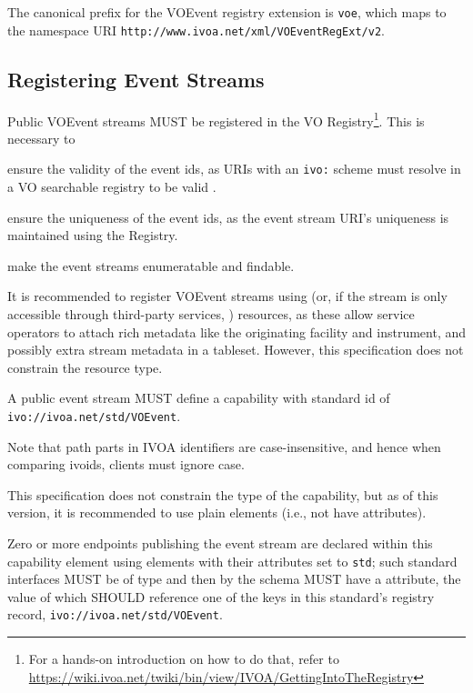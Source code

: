 \documentclass[11pt,a4paper]{ivoa}
\begin{document}
The canonical prefix for the VOEvent registry extension is \verb|voe|,
which maps to the namespace URI
\nolinkurl{http://www.ivoa.net/xml/VOEventRegExt/v2}.

\subsection{Registering Event Streams}
\label{sec:registering}

Public VOEvent streams MUST be registered in the VO
Registry\footnote{For a hands-on introduction on how to do that, refer
to
\url{https://wiki.ivoa.net/twiki/bin/view/IVOA/GettingIntoTheRegistry}}.
This is necessary to

\begin{compactitem}
\item ensure the validity of the event ids, as URIs with an \verb|ivo:|
scheme must resolve in a VO searchable registry to be valid
\citep{2016ivoa.spec.0523D}.
\item ensure the uniqueness of the event ids, as the event stream URI's
uniqueness is maintained using the Registry.
\item make the event streams enumeratable and findable.
\end{compactitem}

It is recommended to register VOEvent streams using
 (or, if the stream is only accessible through
third-party services, )
resources, as these allow service operators
to attach rich metadata like the originating facility and instrument, and
possibly extra stream metadata in a tableset.  However, this
specification does not constrain the resource type.

A public event stream MUST define a capability with standard id of
\nolinkurl{ivo://ivoa.net/std/VOEvent}.

Note that path parts in IVOA identifiers are case-insensitive, and hence
when comparing ivoids, clients must ignore case.

This specification does not constrain the type of the capability, but as
of this version, it is recommended to use plain 
elements (i.e., not have  attributes).

Zero or more endpoints publishing the event stream are declared within
this capability element using  elements with their
 attributes set to \verb|std|; such standard interfaces MUST
be of type  and then by the schema MUST have
a  attribute, the value of which SHOULD reference one
of the keys in this standard's registry record,
\nolinkurl{ivo://ivoa.net/std/VOEvent}.
\end{document}
